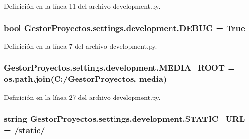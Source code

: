 Definición en la línea 11 del archivo development.\+py.

\subsubsection[{\texorpdfstring{D\+E\+B\+UG}{DEBUG}}]{\setlength{\rightskip}{0pt plus 5cm}bool Gestor\+Proyectos.\+settings.\+development.\+D\+E\+B\+UG = True}\hypertarget{namespace_gestor_proyectos_1_1settings_1_1development_a36c3ebf8a573165139bc1e71d7fdb026}{}\label{namespace_gestor_proyectos_1_1settings_1_1development_a36c3ebf8a573165139bc1e71d7fdb026}


Definición en la línea 7 del archivo development.\+py.

\subsubsection[{\texorpdfstring{M\+E\+D\+I\+A\+\_\+\+R\+O\+OT}{MEDIA_ROOT}}]{\setlength{\rightskip}{0pt plus 5cm}Gestor\+Proyectos.\+settings.\+development.\+M\+E\+D\+I\+A\+\_\+\+R\+O\+OT = os.\+path.\+join(\textquotesingle{}C\+:/Gestor\+Proyectos\textquotesingle{}, \textquotesingle{}media\textquotesingle{})}\hypertarget{namespace_gestor_proyectos_1_1settings_1_1development_a01d424d0a41e5027002458ee71ae36b2}{}\label{namespace_gestor_proyectos_1_1settings_1_1development_a01d424d0a41e5027002458ee71ae36b2}


Definición en la línea 27 del archivo development.\+py.

\subsubsection[{\texorpdfstring{S\+T\+A\+T\+I\+C\+\_\+\+U\+RL}{STATIC_URL}}]{\setlength{\rightskip}{0pt plus 5cm}string Gestor\+Proyectos.\+settings.\+development.\+S\+T\+A\+T\+I\+C\+\_\+\+U\+RL = \textquotesingle{}/static/\textquotesingle{}}\hypertarget{namespace_gestor_proyectos_1_1settings_1_1development_a659abb77c4c1394164349b020712fade}{}\label{namespace_gestor_proyectos_1_1settings_1_1development_a659abb77c4c1394164349b020712fade}


